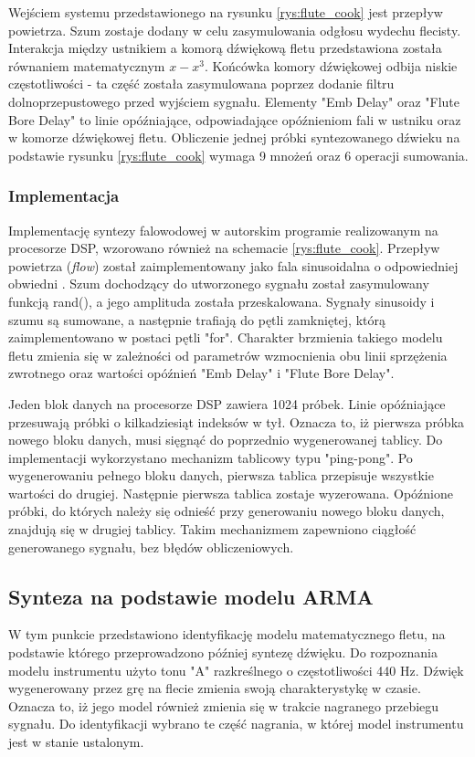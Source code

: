 Wejściem systemu przedstawionego na rysunku \ref{rys:flute_cook} jest przepływ powietrza. Szum zostaje dodany w celu zasymulowania odgłosu wydechu flecisty. 
Interakcja między ustnikiem a komorą dźwiękową fletu przedstawiona została równaniem matematycznym $x-x^3$. Końcówka komory dźwiękowej odbija niskie częstotliwości - ta część została zasymulowana poprzez dodanie filtru dolnoprzepustowego przed wyjściem sygnału. Elementy "Emb Delay" oraz "Flute Bore Delay" to linie opóźniające, odpowiadające opóźnieniom fali w ustniku oraz w komorze dźwiękowej fletu. 
Obliczenie jednej próbki syntezowanego dźwieku na podstawie rysunku \ref{rys:flute_cook} wymaga 9 mnożeń oraz 6 operacji sumowania.

\subsubsection{Implementacja}
Implementację syntezy falowodowej w autorskim programie realizowanym na procesorze DSP,  wzorowano również na schemacie \ref{rys:flute_cook}. Przepływ powietrza (\emph{flow}) został zaimplementowany jako fala sinusoidalna o odpowiedniej obwiedni \cite{flute_prezka}. Szum dochodzący do utworzonego sygnału został zasymulowany funkcją rand(), a jego amplituda została przeskalowana. Sygnały sinusoidy i szumu są sumowane, a następnie trafiają do pętli zamkniętej, którą zaimplementowano w postaci pętli "for". Charakter brzmienia takiego modelu fletu zmienia się w zależności od parametrów wzmocnienia obu linii sprzężenia zwrotnego oraz wartości opóźnień "Emb Delay" i "Flute Bore Delay".

Jeden blok danych na procesorze DSP zawiera 1024 próbek. Linie opóźniające przesuwają próbki o kilkadziesiąt indeksów w tył. Oznacza to, iż pierwsza próbka nowego bloku danych, musi sięgnąć do poprzednio wygenerowanej tablicy. Do implementacji wykorzystano mechanizm tablicowy typu "ping-pong". Po wygenerowaniu pełnego bloku danych, pierwsza tablica przepisuje wszystkie wartości do drugiej. Następnie pierwsza tablica zostaje wyzerowana. Opóźnione próbki, do których należy się odnieść przy generowaniu nowego bloku danych, znajdują się w drugiej tablicy. Takim mechanizmem zapewniono ciągłość generowanego sygnału, bez błędów obliczeniowych.

\subsection{Synteza na podstawie modelu ARMA}
W tym punkcie przedstawiono identyfikację modelu matematycznego fletu, na podstawie którego przeprowadzono później syntezę dźwięku. Do rozpoznania modelu instrumentu użyto tonu "A" razkreślnego o częstotliwości 440 Hz. Dźwięk wygenerowany przez grę na flecie zmienia swoją charakterystykę w czasie. Oznacza to, iż jego model również zmienia się w trakcie nagranego przebiegu sygnału. Do identyfikacji wybrano te część nagrania, w której model instrumentu jest w stanie ustalonym.

